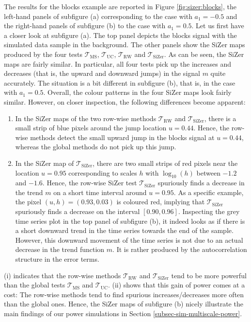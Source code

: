The results for the blocks example are reported in Figure \ref{fig:sizer:blocks}, the left-hand panels of subfigure (a) corresponding to the case with $a_1=-0.5$ and the right-hand panels of subfigure (b) to the case with $a_1=0.5$. Let us first have a closer look at subfigure (a). The top panel depicts the blocks signal with the simulated data sample in the background. The other panels show the SiZer maps produced by the four tests $\mathcal{T}_{\text{MS}}$, $\mathcal{T}_{\text{UC}}$, $\mathcal{T}_{\text{RW}}$ and $\mathcal{T}_{\text{SiZer}}$. As can be seen, the SiZer maps are fairly similar. In particular, all four tests pick up the increases and decreases (that is, the upward and downward jumps) in the signal $m$ quite accurately. The situation is a bit different in subfigure (b), that is, in the case with $a_1=0.5$. Overall, the colour patterns in the four SiZer maps look fairly similar. However, on closer inspection, the following differences become apparent: 
\begin{enumerate}[leftmargin=0.8cm,label=(\roman*)]

\item In the SiZer maps of the two row-wise methods $\mathcal{T}_{\text{RW}}$ and $\mathcal{T}_{\text{SiZer}}$, there is a small strip of blue pixels around the jump location $u=0.44$. Hence, the row-wise methods detect the small upward jump in the blocks signal at $u=0.44$, whereas the global methods do not pick up this jump. 

\item In the SiZer map of $\mathcal{T}_{\text{SiZer}}$, there are two small strips of red pixels near the location $u=0.95$ corresponding to scales $h$ with $\log_{10}(h)$ between $-1.2$ and $-1.6$. Hence, the row-wise SiZer test $\mathcal{T}_{\text{SiZer}}$ spuriously finds a decrease in the trend $m$ on a short time interval around $u=0.95$. As a specific example, the pixel $(u,h) = (0.93,0.03)$ is coloured red, implying that $\mathcal{T}_{\text{SiZer}}$ spuriously finds a decrease on the interval $[0.90,0.96]$. Inspecting the grey time series plot in the top panel of subfigure (b), it indeed looks as if there is a short downward trend in the time series towards the end of the sample. However, this downward movement of the time series is not due to an actual decrease in the trend function $m$. It is rather produced by the autocorrelation structure in the error terms. 

\end{enumerate}
(i) indicates that the row-wise methods  $\mathcal{T}_{\text{RW}}$ and $\mathcal{T}_{\text{SiZer}}$ tend to be more powerful than the global tests $\mathcal{T}_{\text{MS}}$ and $\mathcal{T}_{\text{UC}}$. (ii) shows that this gain of power comes at a cost: The row-wise methods tend to find spurious increases/decreases more often than the global ones. Hence, the SiZer maps of subfigure (b) nicely illustrate the main findings of our power simulations in Section \ref{subsec-sim-multiscale-power}.


